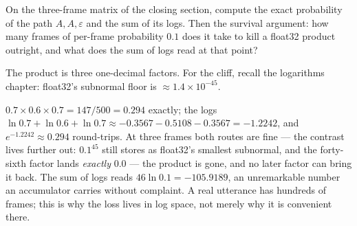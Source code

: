 \begin{problem}[stretch]
On the three-frame matrix of the closing section, compute the exact
probability of the path $A, A, \varepsilon$ and the sum of its logs.
Then the survival argument: how many frames of per-frame probability
$0.1$ does it take to kill a float32 product outright, and what does
the sum of logs read at that point?
\begin{hint}
The product is three one-decimal factors. For the cliff, recall the
logarithms chapter: float32's subnormal floor is
$\approx 1.4 \times 10^{-45}$.
\end{hint}
\begin{solution}
$0.7 \times 0.6 \times 0.7 = 147/500 = 0.294$ exactly; the logs
$\ln 0.7 + \ln 0.6 + \ln 0.7 \approx -0.3567 - 0.5108 - 0.3567
= -1.2242$, and $e^{-1.2242} \approx 0.294$ round-trips. At three
frames both routes are fine — the contrast lives further out:
$0.1^{45}$ still stores as float32's smallest subnormal, and the
forty-sixth factor lands \emph{exactly} $0.0$ — the product is gone,
and no later factor can bring it back. The sum of logs reads
$46 \ln 0.1 = -105.9189$, an unremarkable number an accumulator
carries without complaint. A real utterance has hundreds of frames;
this is why the loss lives in log space, not merely why it is
convenient there.
\end{solution}
\end{problem}
